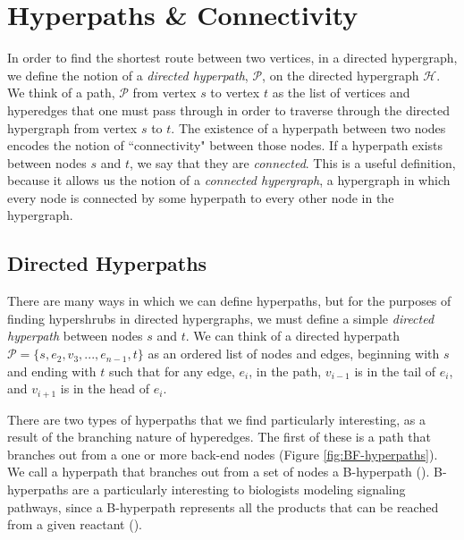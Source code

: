 \documentclass[12pt,twoside]{reedthesis}
\theoremstyle{definition}
\begin{document}
\section{Hyperpaths \& Connectivity}
In order to find the shortest route between two vertices, in a directed hypergraph, we define the notion of a \textit{directed hyperpath}, $\mathcal{P}$, on the directed hypergraph $\mathcal{H}$.  We think of a path, $\mathcal{P}$ from vertex $s$ to vertex $t$ as the list of vertices and hyperedges that one must pass through in order to traverse through the directed hypergraph from vertex $s$ to $t$. The existence of a hyperpath between two nodes encodes the notion of ``connectivity" between those nodes.  If a hyperpath exists between nodes $s$ and $t$, we say that they are \textit{connected}. This is a useful definition, because it allows us the notion of a \textit{connected hypergraph}, a hypergraph in which every node is connected by some hyperpath to every other node in the hypergraph.\par

\subsection{Directed Hyperpaths}

There are many ways in which we can define hyperpaths, but for the purposes of finding hypershrubs in directed hypergraphs, we must define a simple \textit{directed hyperpath} between nodes $s$ and $t$. We can think of a directed hyperpath $\mathcal{P}=\{s,e_2,v_3,...,e_{n-1},t\}$ as an ordered list of nodes and edges, beginning with $s$ and ending with $t$ such that for any edge, $e_i$, in the path, $v_{i-1}$ is in the tail of $e_i$, and $v_{i+1}$ is in the head of $e_i$.\par

There are two types of hyperpaths that we find particularly interesting, as a result of the branching nature of hyperedges. The first of these is a path that branches out from a one or more back-end nodes (Figure \ref{fig:BF-hyperpaths}). We call a hyperpath that branches out from a set of nodes a B-hyperpath (\cite{Gallo1993}). B-hyperpaths are a particularly interesting to biologists modeling signaling pathways, since a B-hyperpath represents all the products that can be reached from a given reactant (\cite{Ritz2014}).
\end{document}
